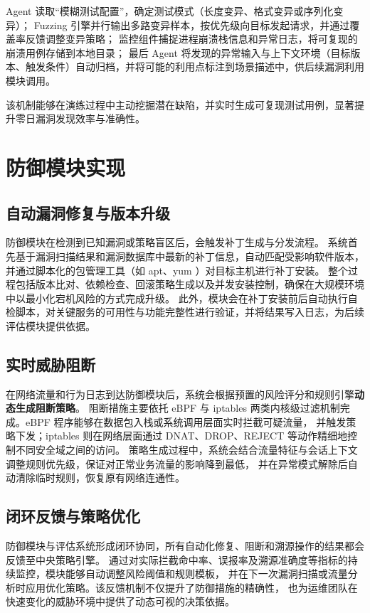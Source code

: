 \documentclass[lang=cn,10pt]{elegantbook}
\begin{document}
Agent 读取“模糊测试配置”，确定测试模式（长度变异、格式变异或序列化变异）；  
Fuzzing 引擎并行输出多路变异样本，按优先级向目标发起请求，并通过覆盖率反馈调整变异策略；  
监控组件捕捉进程崩溃栈信息和异常日志，将可复现的崩溃用例存储到本地目录；  
最后 Agent 将发现的异常输入与上下文环境（目标版本、触发条件）自动归档，并将可能的利用点标注到场景描述中，供后续漏洞利用模块调用。

该机制能够在演练过程中主动挖掘潜在缺陷，并实时生成可复现测试用例，显著提升零日漏洞发现效率与准确性。


\section{防御模块实现}

\subsection{自动漏洞修复与版本升级}  
防御模块在检测到已知漏洞或策略盲区后，会触发补丁生成与分发流程。
系统首先基于漏洞扫描结果和漏洞数据库中最新的补丁信息，自动匹配受影响软件版本，
并通过脚本化的包管理工具（如 apt、yum ）对目标主机进行补丁安装。
整个过程包括版本比对、依赖检查、回滚策略生成以及并发安装控制，确保在大规模环境中以最小化宕机风险的方式完成升级。
此外，模块会在补丁安装前后自动执行自检脚本，对关键服务的可用性与功能完整性进行验证，并将结果写入日志，为后续评估模块提供依据。

\subsection{实时威胁阻断}  
在网络流量和行为日志到达防御模块后，系统会根据预置的风险评分和规则引擎\textbf{动态生成阻断策略}。
阻断措施主要依托 eBPF 与 iptables 两类内核级过滤机制完成。eBPF 程序能够在数据包入栈或系统调用层面实时拦截可疑流量，
并触发策略下发；iptables 则在网络层面通过 DNAT、DROP、REJECT 等动作精细地控制不同安全域之间的访问。
策略生成过程中，系统会结合流量特征与会话上下文调整规则优先级，保证对正常业务流量的影响降到最低，
并在异常模式解除后自动清除临时规则，恢复原有网络连通性。

\subsection{闭环反馈与策略优化}  
防御模块与评估系统形成闭环协同，所有自动化修复、阻断和溯源操作的结果都会反馈至中央策略引擎。
通过对实际拦截命中率、误报率及溯源准确度等指标的持续监控，模块能够自动调整风险阈值和规则模板，
并在下一次漏洞扫描或流量分析时应用优化策略。该反馈机制不仅提升了防御措施的精确性，
也为运维团队在快速变化的威胁环境中提供了动态可视的决策依据。
\end{document}

